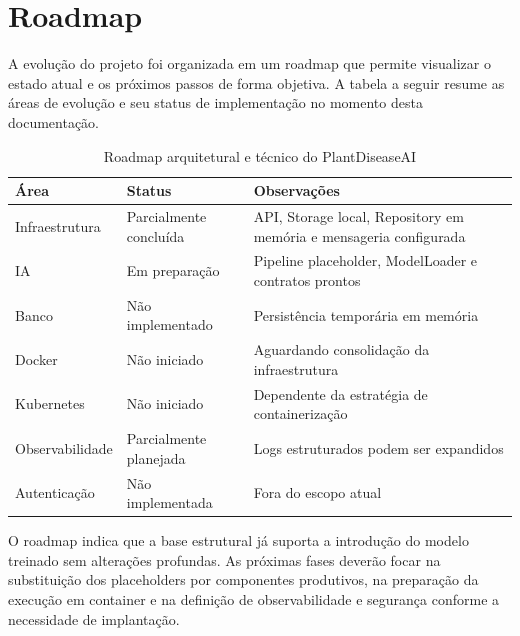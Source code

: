 \chapter{Roadmap}

A evolução do projeto foi organizada em um roadmap que permite visualizar o estado atual e os próximos passos de forma objetiva. A tabela a seguir resume as áreas de evolução e seu status de implementação no momento desta documentação.

\begin{table}[H]
    \centering
    \caption{Roadmap arquitetural e técnico do PlantDiseaseAI}
    \label{tab:roadmap}
    \begin{tabular}{p{4cm}p{4cm}p{5cm}}
        \toprule
        \textbf{Área} & \textbf{Status} & \textbf{Observações} \\
        \midrule
        Infraestrutura & Parcialmente concluída & API, Storage local, Repository em memória e mensageria configurada \\
        IA & Em preparação & Pipeline placeholder, ModelLoader e contratos prontos \\
        Banco & Não implementado & Persistência temporária em memória \\
        Docker & Não iniciado & Aguardando consolidação da infraestrutura \\
        Kubernetes & Não iniciado & Dependente da estratégia de containerização \\
        Observabilidade & Parcialmente planejada & Logs estruturados podem ser expandidos \\
        Autenticação & Não implementada & Fora do escopo atual \\
        \bottomrule
    \end{tabular}
\end{table}

O roadmap indica que a base estrutural já suporta a introdução do modelo treinado sem alterações profundas. As próximas fases deverão focar na substituição dos placeholders por componentes produtivos, na preparação da execução em container e na definição de observabilidade e segurança conforme a necessidade de implantação.
